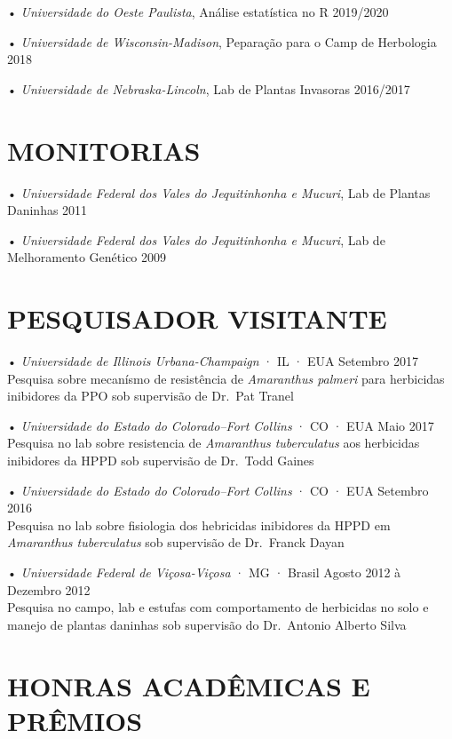 \documentclass[11pt,]{article}
\begin{document}
• \emph{Universidade do Oeste Paulista}, Análise estatística no R
\hfill 2019/2020

• \emph{Universidade de Wisconsin-Madison}, Peparação para o Camp de
Herbologia \hfill 2018

• \emph{Universidade de Nebraska-Lincoln}, Lab de Plantas Invasoras
\hfill 2016/2017

\hypertarget{monitorias}{%
\section{MONITORIAS}\label{monitorias}}

• \emph{Universidade Federal dos Vales do Jequitinhonha e Mucuri}, Lab
de Plantas Daninhas \hfill 2011

• \emph{Universidade Federal dos Vales do Jequitinhonha e Mucuri}, Lab
de Melhoramento Genético \hfill 2009

\hypertarget{pesquisador-visitante}{%
\section{PESQUISADOR VISITANTE}\label{pesquisador-visitante}}

• \emph{Universidade de Illinois Urbana-Champaign} · IL · EUA
\hfill Setembro 2017\\
Pesquisa sobre mecanísmo de resistência de \emph{Amaranthus palmeri}
para herbicidas inibidores da PPO sob supervisão de Dr.~Pat Tranel

• \emph{Universidade do Estado do Colorado--Fort Collins} · CO · EUA
\hfill Maio 2017\\
Pesquisa no lab sobre resistencia de \emph{Amaranthus tuberculatus} aos
herbicidas inibidores da HPPD sob supervisão de Dr.~Todd Gaines

• \emph{Universidade do Estado do Colorado--Fort Collins} · CO · EUA
\hfill Setembro 2016\\
Pesquisa no lab sobre fisiologia dos hebricidas inibidores da HPPD em
\emph{Amaranthus tuberculatus} sob supervisão de Dr.~Franck Dayan

• \emph{Universidade Federal de Viçosa-Viçosa} · MG · Brasil
\hfill Agosto 2012 à Dezembro 2012\\
Pesquisa no campo, lab e estufas com comportamento de herbicidas no solo
e manejo de plantas daninhas sob supervisão do Dr.~Antonio Alberto Silva

\hypertarget{honras-acaduxeamicas-e-pruxeamios}{%
\section{HONRAS ACADÊMICAS E
PRÊMIOS}\label{honras-acaduxeamicas-e-pruxeamios}}
\end{document}
